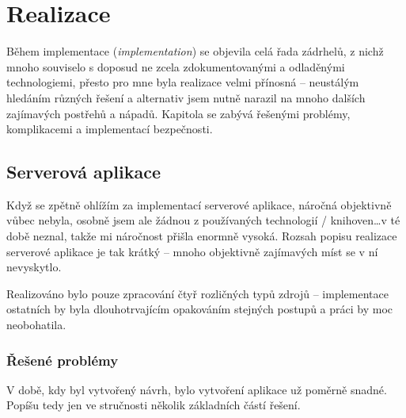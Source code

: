 
\chapter{Realizace}
Během implementace (\textit{implementation}) se objevila celá řada zádrhelů, z nichž mnoho souviselo s doposud ne zcela zdokumentovanými a odladěnými technologiemi, přesto pro mne byla realizace velmi přínosná -- neustálým hledáním různých řešení a alternativ jsem nutně narazil na mnoho dalších zajímavých postřehů a nápadů. Kapitola se zabývá řešenými problémy, komplikacemi a implementací bezpečnosti. %

\section{Serverová aplikace}
Když se zpětně ohlížím za implementací serverové aplikace, náročná objektivně vůbec nebyla, osobně jsem ale žádnou z používaných technologií / knihoven\dots v té době neznal, takže mi náročnost přišla enormně vysoká. Rozsah popisu realizace serverové aplikace je tak krátký -- mnoho objektivně zajímavých míst se v ní nevyskytlo.

Realizováno bylo pouze zpracování čtyř rozličných typů zdrojů -- implementace ostatních by byla dlouhotrvajícím opakováním stejných postupů a práci by moc neobohatila.

\subsection{Řešené problémy}
V době, kdy byl vytvořený návrh, bylo vytvoření aplikace už poměrně snadné. Popíšu tedy jen ve stručnosti několik základních částí řešení.

